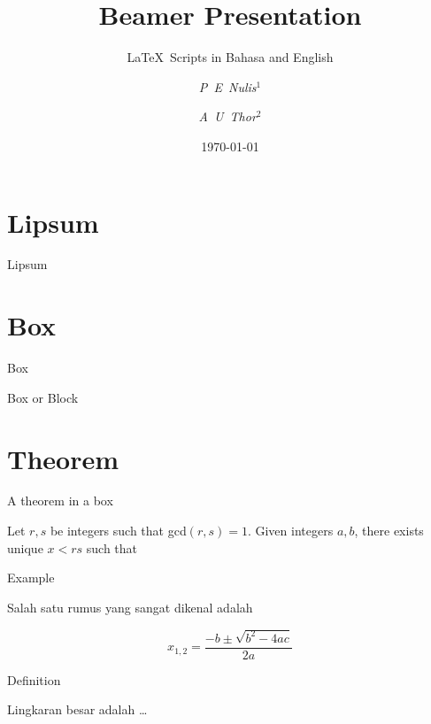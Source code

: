 \documentclass[11pt,aspectratio=169]{beamer}
\title{Beamer Presentation}
\subtitle{\LaTeX\ Scripts in Bahasa and English}
\author[Nulis \& Thor]{\textit{P~E~Nulis}$^1$ \and \textit{A~U~Thor}$^2$}
\institute[Affiliation One \& Affiliation Two]{$^1$Affiliation One\\ $^2$Affiliation Two}
\date{\today}
\begin{document}
\begin{frame}[plain]
\maketitle
\end{frame}

\begin{frame}{\contentsname}
\tableofcontents
\end{frame}

\section{Lipsum}
\begin{frame}{Lipsum}
\lipsum[3]
\end{frame}

\section{Box}
\begin{frame}{Box}
\begin{block}{Box or Block}
\lipsum[3]
\end{block}
\end{frame}

\section{Theorem}
\begin{frame}{A theorem in a box}
\begin{theorem}
Let $r, s$ be integers such that gcd$(r, s)=1$. Given integers $a,b$, there exists unique $x <rs$ such that
\end{theorem}
\end{frame}

\begin{frame}{Example}
\begin{example}
Salah satu rumus yang sangat dikenal adalah

\begin{equation}
    x_{1,2} = \frac{-b \pm \sqrt{b^2 - 4 a c}}{2 a}
\end{equation}
\end{example}
\end{frame}

\begin{frame}{Definition}
\begin{definition}
Lingkaran besar adalah \ldots
\end{definition}
\end{frame}
\end{document}
